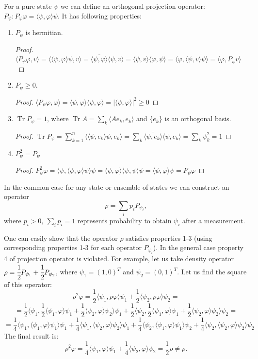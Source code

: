 \documentclass[%
master,         %
subf,           %
href,           %
colorlinks=true %
]{disser}
\DeclareMathOperator{\Tr}{Tr}
\numberwithin{equation}{section}
\numberwithin{figure}{section}
\begin{document}
For a pure state $\psi$ we can define an orthogonal projection operator: $P_\psi: P_\psi\varphi = \langle \psi, \varphi \rangle \psi$. It has following properties:
\begin{enumerate}
\item $P_\psi$ is hermitian. 
\begin{proof}
$\langle P_\psi\varphi, v\rangle = \langle \langle\psi,\varphi\rangle \psi, v\rangle = \overline{\langle\psi,\varphi\rangle} \langle\psi, v\rangle = \langle\psi, v\rangle \langle\varphi,\psi\rangle  = \langle\varphi, \langle\psi, v\rangle\psi\rangle = \langle\varphi, P_\psi v \rangle$
\end{proof}
\item $P_\psi \geq 0$.
\begin{proof}
$\langle P_\psi\varphi, \varphi\rangle = \overline{\langle\psi,\varphi\rangle} \langle\psi, \varphi\rangle = |\langle\psi, \varphi\rangle|^2 \geq 0$
\end{proof}
\item $\Tr P_\psi = 1$, where $\Tr A = \sum_k \langle Ae_k, e_k\rangle$ and $\{e_k\}$ is an orthogonal basis.
\begin{proof}
$\Tr P_\psi = \sum_{k = 1}^n \langle \langle \psi, e_k\rangle\psi, e_k\rangle = \sum_k \overline{\langle\psi, e_k\rangle}\langle\psi, e_k\rangle = \sum_k\psi_k^2 = 1$
\end{proof}
\item $P_\psi^2 = P_\psi$
\begin{proof}
$P_\psi^2\varphi = \langle\psi, \langle\psi, \varphi\rangle \psi\rangle \psi = \langle\psi, \varphi\rangle \langle\psi, \psi\rangle\psi = \langle\psi, \varphi\rangle\psi = P_\psi\varphi $
\end{proof}
\end{enumerate}
In the common case for any state or ensemble of states we can construct an operator
\[
\rho = \sum_ip_iP_{\psi_i},
\]
where $p_i > 0,\ \sum_ip_i = 1$ represents probability to obtain $\psi_i$ after a measurement.

One can easily show that the operator $\rho$ satisfies properties 1-3 (using corresponding properties 1-3 for each operator $P_{\psi_i}$). In the general case property 4 of projection operator is violated. For example, let us take density operator $\rho = \cfrac 12P_{\psi_1} + \cfrac 12P_{\psi_2}$, where $\psi_1 = (1, 0)^T$ and $\psi_2 = (0, 1)^T$. Let us find the square of this operator:
\[
\rho^2\varphi = \frac 12\langle\psi_1, \rho\varphi\rangle\psi_1 + \frac 12\langle\psi_2, \rho\varphi\rangle\psi_2 =
\]
\[
= \frac 12\langle\psi_1, \frac 12\langle\psi_1, \varphi\rangle\psi_1 + \frac 12\langle\psi_2, \varphi\rangle\psi_2 \rangle\psi_1 + \frac 12\langle\psi_2, \frac 12\langle\psi_1, \varphi\rangle\psi_1 + \frac 12\langle\psi_2, \varphi\rangle\psi_2 \rangle\psi_2 =
\]
\[
 = 
\frac 14\langle\psi_1, \langle\psi_1,\varphi\rangle\psi_1\rangle\psi_1 + \frac 14\langle\psi_1, \langle\psi_2,\varphi\rangle\psi_2\rangle\psi_1 +
\frac 14\langle\psi_2, \langle\psi_1,\varphi\rangle\psi_1\rangle\psi_2 + \frac 14\langle\psi_2, \langle\psi_2,\varphi\rangle\psi_2\rangle\psi_2
\]
The final result is:
\[
\rho^2\varphi = \frac 14 \langle\psi_1, \varphi\rangle\psi_1 + \frac 14\langle\psi_2, \varphi\rangle\psi_2 = \frac 12\rho \neq \rho.
\]
\end{document}
